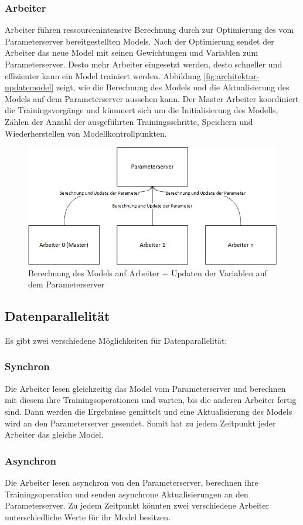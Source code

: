 \subsubsection{Arbeiter}
Arbeiter führen ressourcenintensive Berechnung durch zur Optimierung des vom Parameterserver bereitgestellten Models. Nach der Optimierung sendet der Arbeiter das neue Model mit seinen Gewichtungen und Variablen zum Parameterserver. Desto mehr Arbeiter eingesetzt werden, desto schneller und effizienter kann ein Model trainiert werden. Abbildung \ref{fig:architektur-updatemodel} zeigt, wie die Berechnung des Models und die Aktualisierung des Models auf dem Parameterserver aussehen kann. Der Master Arbeiter koordiniert die Trainingsvorgänge und kümmert sich um die Initialisierung des Modells, Zählen der Anzahl der ausgeführten Trainingsschritte, Speichern und Wiederherstellen von Modellkontrollpunkten.

\begin{figure}[h!]
	\centering
	\includegraphics[width=0.9\linewidth]{Pictures/Architektur-UpdateModel}
	\caption[Berechnung des Models auf Arbeiter + Updaten der Variablen auf dem Parameterserver]{Berechnung des Models auf Arbeiter + Updaten der Variablen auf dem Parameterserver}
	\label{fig:architektur-servemodel}
\end{figure}

\subsection{Datenparallelität}
Es gibt zwei verschiedene Möglichkeiten für Datenparallelität:
\subsubsection{Synchron}
Die Arbeiter lesen gleichzeitig das Model vom Parameterserver und berechnen mit diesem ihre Trainingsoperationen und warten, bis die anderen Arbeiter fertig sind. Dann werden die Ergebnisse gemittelt und eine Aktualisierung des Models wird an den Parameterserver gesendet. Somit hat zu jedem Zeitpunkt jeder Arbeiter das gleiche Model.

\subsubsection{Asynchron}
Die Arbeiter lesen asynchron von den Parameterserver, berechnen ihre Trainingsoperation und senden asynchrone Aktualisierungen an den Parameterserver. Zu jedem Zeitpunkt könnten zwei verschiedene Arbeiter unterschiedliche Werte für ihr Model besitzen.





